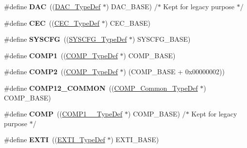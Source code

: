 \begin{DoxyCompactItemize}
\#define {\bfseries D\+AC}~((\hyperlink{struct_d_a_c___type_def}{D\+A\+C\+\_\+\+Type\+Def} $\ast$) D\+A\+C\+\_\+\+B\+A\+SE) /$\ast$ Kept for legacy purpose $\ast$/
\item 
\mbox{\label{group___peripheral__declaration_ga7d03f4d873d59ff8bc76b6c9b576f3e3}} 
\#define {\bfseries C\+EC}~((\hyperlink{struct_c_e_c___type_def}{C\+E\+C\+\_\+\+Type\+Def} $\ast$) C\+E\+C\+\_\+\+B\+A\+SE)
\item 
\mbox{\label{group___peripheral__declaration_ga3c833fe1c486cb62250ccbca32899cb8}} 
\#define {\bfseries S\+Y\+S\+C\+FG}~((\hyperlink{struct_s_y_s_c_f_g___type_def}{S\+Y\+S\+C\+F\+G\+\_\+\+Type\+Def} $\ast$) S\+Y\+S\+C\+F\+G\+\_\+\+B\+A\+SE)
\item 
\mbox{\label{group___peripheral__declaration_gaf5713f83009027d48805b049d55bb01b}} 
\#define {\bfseries C\+O\+M\+P1}~((\hyperlink{struct_c_o_m_p___type_def}{C\+O\+M\+P\+\_\+\+Type\+Def} $\ast$) C\+O\+M\+P\+\_\+\+B\+A\+SE)
\item 
\mbox{\label{group___peripheral__declaration_ga6985fa7e9bb3c2edf15b29b7af210a2b}} 
\#define {\bfseries C\+O\+M\+P2}~((\hyperlink{struct_c_o_m_p___type_def}{C\+O\+M\+P\+\_\+\+Type\+Def} $\ast$) (C\+O\+M\+P\+\_\+\+B\+A\+SE + 0x00000002))
\item 
\mbox{\label{group___peripheral__declaration_ga7c0dbc759386dc94597d1ab7b798e75f}} 
\#define {\bfseries C\+O\+M\+P12\+\_\+\+C\+O\+M\+M\+ON}~((\hyperlink{struct_c_o_m_p___common___type_def}{C\+O\+M\+P\+\_\+\+Common\+\_\+\+Type\+Def} $\ast$) C\+O\+M\+P\+\_\+\+B\+A\+SE)
\item 
\mbox{\label{group___peripheral__declaration_ga076912543697dbe4c46b79e8e44ad2fb}} 
\#define {\bfseries C\+O\+MP}~((\hyperlink{struct_c_o_m_p1__2___type_def}{C\+O\+M\+P1\+\_\+\_\+\+Type\+Def} $\ast$) C\+O\+M\+P\+\_\+\+B\+A\+SE) /$\ast$ Kept for legacy purpose $\ast$/
\item 
\mbox{\label{group___peripheral__declaration_ga9189e770cd9b63dadd36683eb9843cac}} 
\#define {\bfseries E\+X\+TI}~((\hyperlink{struct_e_x_t_i___type_def}{E\+X\+T\+I\+\_\+\+Type\+Def} $\ast$) E\+X\+T\+I\+\_\+\+B\+A\+SE)

\end{DoxyCompactItemize}
